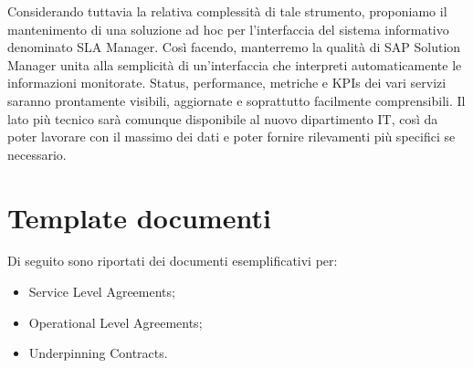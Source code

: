 Considerando tuttavia la relativa complessità di tale strumento, proponiamo il mantenimento di una soluzione ad hoc per l'interfaccia del sistema informativo denominato SLA Manager. Così facendo, manterremo la qualità di SAP Solution Manager unita alla semplicità di un'interfaccia che interpreti automaticamente le informazioni monitorate. Status, performance, metriche e KPIs dei vari servizi saranno prontamente visibili, aggiornate e soprattutto facilmente comprensibili. Il lato più tecnico sarà comunque disponibile al nuovo dipartimento IT, così da poter lavorare con il massimo dei dati e poter fornire rilevamenti più specifici se necessario.


\section{Template documenti}

Di seguito sono riportati dei documenti esemplificativi per:

\begin{itemize}
	\item Service Level Agreements;
    \item Operational Level Agreements;
    \item Underpinning Contracts.
\end{itemize}






